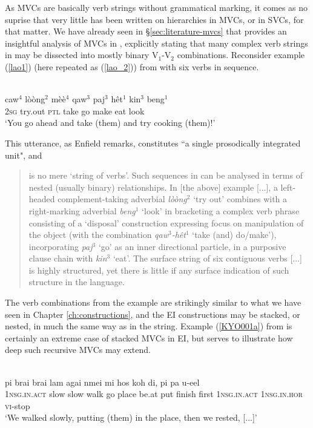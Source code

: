 \largerpage[-1]
As MVCs are basically verb strings without grammatical marking, it comes as no suprise that very little has been written on hierarchies in MVCs, or in SVCs, for that matter. We have already seen in §\ref{sec:literature-mvcs} that \citet{enfield2008verbs} provides an insightful analysis of MVCs in , explicitly stating that many complex verb strings in  may be dissected into mostly binary V$_1$-V$_2$ combinations. Reconsider example (\ref{lao1}) (here repeated as (\ref{lao_2})) from  with six verbs in sequence.

\ea \label{lao_2}
\\
\gll caw$^4$ lòòng$^2$ mèè$^4$ qaw$^3$ paj$^3$ hêt$^1$ kin$^3$ beng$^1$ \\
2\textsc{sg} try.out \textsc{ptl} take go make eat look \\
\glft `You go ahead and take (them) and try cooking (them)!'\\
\z

This utterance, as Enfield remarks, constitutes ``a single prosodically integrated unit", and \begin{quote}is no mere `string of verbs'. Such sequences in  can be analysed in terms of nested (usually binary) relationships. In [the above] example [...], a left-headed complement-taking adverbial \textit{lòòng$^2$} `try out' combines with a right-marking adverbial \textit{beng$^1$} `look' in bracketing a complex verb phrase consisting of a `disposal' construction expressing focus on manipulation of the object (with the combination \textit{qaw$^3$-hêt$^1$} `take (and) do/make'), incorporating \textit{paj$^3$} `go' as an inner directional particle, in a purposive clause chain with \textit{kin$^3$} `eat'. The surface string of six contiguous verbs [...] is highly structured, yet there is little if any surface indication of such structure in the language. \citep[83]{enfield2008verbs}\end{quote}

The verb combinations from the  example are strikingly similar to what we have seen in Chapter \ref{ch:constructions}, and the EI constructions may be stacked, or nested, in much the same way as in the  string. Example (\ref{KYO001a}) from  is certainly an extreme case of stacked MVCs in EI, but serves to illustrate how deep such recursive MVCs may extend.

\ea \label{KYO001a}
\\
\gll pi brai brai lam agai nmei mi hos koh di, pi pa u-eel\\
\textsc{1}\textsc{nsg}.\textsc{in}.\textsc{act} slow slow walk go place be.at put finish first \textsc{1}\textsc{nsg}.\textsc{in}.\textsc{act} \textsc{1}\textsc{nsg}.\textsc{in}.\textsc{hor} \textsc{vi}-stop\\
\glft `We walked slowly, putting (them) in the place, then we rested, [...]'\\
\z

